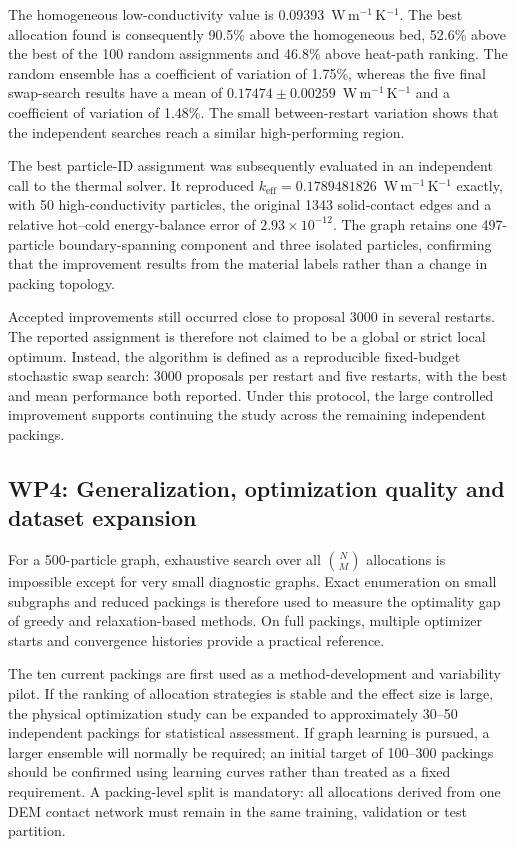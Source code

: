 \documentclass[12pt,a4paper]{article}
\begin{document}
The homogeneous low-conductivity value is 0.09393~W\,m$^{-1}$\,K$^{-1}$. The
best allocation found is consequently 90.5\% above the homogeneous bed, 52.6\%
above the best of the 100 random assignments and 46.8\% above heat-path
ranking. The random ensemble has a coefficient of variation of 1.75\%, whereas
the five final swap-search results have a mean of
$0.17474\pm0.00259$~W\,m$^{-1}$\,K$^{-1}$ and a coefficient of variation of
1.48\%. The small between-restart variation shows that the independent searches
reach a similar high-performing region.

The best particle-ID assignment was subsequently evaluated in an independent
call to the thermal solver. It reproduced
$k_{\mathrm{eff}}=0.1789481826$~W\,m$^{-1}$\,K$^{-1}$ exactly, with 50
high-conductivity particles, the original 1343 solid-contact edges and a
relative hot--cold energy-balance error of $2.93\times10^{-12}$. The graph
retains one 497-particle boundary-spanning component and three isolated
particles, confirming that the improvement results from the material labels
rather than a change in packing topology.

Accepted improvements still occurred close to proposal 3000 in several
restarts. The reported assignment is therefore not claimed to be a global or
strict local optimum. Instead, the algorithm is defined as a reproducible
fixed-budget stochastic swap search: 3000 proposals per restart and five
restarts, with the best and mean performance both reported. Under this protocol,
the large controlled improvement supports continuing the study across the
remaining independent packings.

\subsection*{WP4: Generalization, optimization quality and dataset expansion}

For a 500-particle graph, exhaustive search over all $\binom{N}{M}$ allocations
is impossible except for very small diagnostic graphs. Exact enumeration on
small subgraphs and reduced packings is therefore used to measure the
optimality gap of greedy and relaxation-based methods. On full packings,
multiple optimizer starts and convergence histories provide a practical
reference.

The ten current packings are first used as a method-development and variability
pilot. If the ranking of allocation strategies is stable and the effect size is
large, the physical optimization study can be expanded to approximately
30--50 independent packings for statistical assessment. If graph learning is
pursued, a larger ensemble will normally be required; an initial target of
100--300 packings should be confirmed using learning curves rather than treated
as a fixed requirement. A packing-level split is mandatory: all allocations
derived from one DEM contact network must remain in the same training,
validation or test partition.
\end{document}
